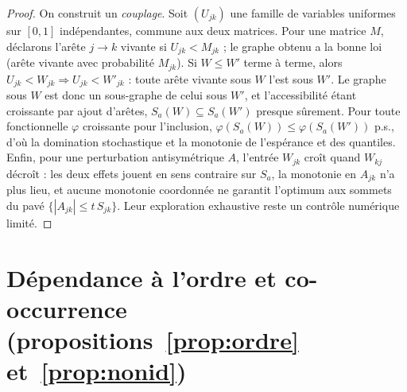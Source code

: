 \begin{proof}
On construit un \emph{couplage}. Soit $(U_{jk})$ une famille de variables uniformes sur $[0,1]$
indépendantes, commune aux deux matrices. Pour une matrice $M$, déclarons l'arête $j\to k$
vivante si $U_{jk}<M_{jk}$ ; le graphe obtenu a la bonne loi (arête vivante avec probabilité
$M_{jk}$). Si $W\le W'$ terme à terme, alors $U_{jk}<W_{jk}\Rightarrow U_{jk}<W'_{jk}$ : toute
arête vivante sous $W$ l'est sous $W'$. Le graphe sous $W$ est donc un sous-graphe de celui sous
$W'$, et l'accessibilité étant croissante par ajout d'arêtes, $S_a(W)\subseteq S_a(W')$ presque
sûrement. Pour toute fonctionnelle $\varphi$ croissante pour l'inclusion,
$\varphi(S_a(W))\le\varphi(S_a(W'))$ p.s., d'où la domination stochastique et la monotonie de
l'espérance et des quantiles. Enfin, pour une perturbation antisymétrique $A$, l'entrée $W_{jk}$
croît quand $W_{kj}$ décroît : les deux effets jouent en sens contraire sur $S_a$, la monotonie
en $A_{jk}$ n'a plus lieu, et aucune monotonie coordonnée ne garantit l'optimum aux sommets du pavé $\{|A_{jk}|\le t\,S_{jk}\}$. Leur exploration exhaustive reste un contrôle numérique limité.
\end{proof}

\section*{Dépendance à l'ordre et co-occurrence (propositions~\ref{prop:ordre} et~\ref{prop:nonid})}

